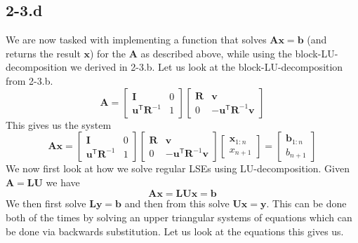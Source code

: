\documentclass{article}
\begin{document}
\subsection*{2-3.d}
We are now tasked with implementing a function that solves $\mathbf{A}\mathbf{x} = \mathbf{b}$ (and returns the result $\mathbf{x}$) for the $\mathbf{A}$ as described above, while using the block-LU-decomposition we derived in 2-3.b. Let us look at the block-LU-decomposition from 2-3.b.
\begin{equation*}
     \mathbf{A} = \begin{bmatrix}
        \mathbf{I} & 0 \\
        \mathbf{u}^{\mathsf{T}}\mathbf{R}^{-1} & 1
    \end{bmatrix}
    \begin{bmatrix}
        \mathbf{R} & \mathbf{v} \\
        0 &  - \mathbf{u}^{\mathsf{T}}\mathbf{R}^{-1}\mathbf{v}
    \end{bmatrix}
\end{equation*}
This gives us the system
\begin{equation*}
    \mathbf{A}\mathbf{x} = \begin{bmatrix}
        \mathbf{I} & 0 \\
        \mathbf{u}^{\mathsf{T}}\mathbf{R}^{-1} & 1
    \end{bmatrix}
    \begin{bmatrix}
        \mathbf{R} & \mathbf{v} \\
        0 &  - \mathbf{u}^{\mathsf{T}}\mathbf{R}^{-1}\mathbf{v}
    \end{bmatrix}\begin{bmatrix}
        \mathbf{x}_{1:n} \\ x_{n + 1}
    \end{bmatrix} = \begin{bmatrix}
        \mathbf{b}_{1:n} \\ b_{n + 1}
    \end{bmatrix}
\end{equation*}
We now first look at how we solve regular LSEs using LU-decomposition. Given $\mathbf{A} = \mathbf{L}\mathbf{U}$ we have
\begin{equation*}
    \mathbf{A}\mathbf{x} = \mathbf{L}\mathbf{U}\mathbf{x} = \mathbf{b}
\end{equation*}
We then first solve $\mathbf{L}\mathbf{y} = \mathbf{b}$ and then from this solve $\mathbf{U}\mathbf{x} = \mathbf{y}$. This can be done both of the times by solving an upper triangular systems of equations which can be done via backwards substitution. Let us look at the equations this gives us.
\end{document}
